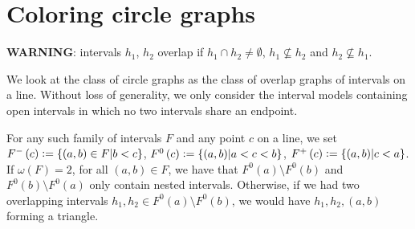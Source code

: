 \documentclass[12pt]{article}
\theoremstyle{definition}
\newcommand{\defeq}{\vcentcolon=}
\begin{document}
    \section{Coloring circle graphs}
    
    \textbf{WARNING}: intervals
    $h_1$, $h_2$ overlap if
    $h_1 \cap h_2 \neq \emptyset$,
    $h_1 \not \subseteq h_2$ and
    $h_2 \not \subseteq h_1$.
    \vspace{4pt}

    We look at the class
    of circle graphs as the class
    of overlap graphs of intervals on a line.
    Without loss of generality,
    we only consider the interval
    models containing open intervals
    in which no two intervals
    share an endpoint.

    For any such family of intervals
    $F$ and any point $c$ on a line,
    we set $F^{-}\left(c\right) \defeq
    \left\{\left(a, b\right) \in F
    \middle| b < c\right\}$,
    $F^{0}\left(c\right) \defeq
    \left\{\left(a, b\right)
    \middle| a < c < b\right\}$,
    $F^{+}\left(c\right) \defeq
    \left\{\left(a, b\right)
    \middle| c < a\right\}$.
    If $\omega\left(F\right) = 2$,
    for all $\left(a, b\right) \in F$,
    we have that
    $F^{0}\left(a\right) \setminus F^{0}\left(b\right)$ 
    and $F^{0}\left(b\right) \setminus F^{0}\left(a\right)$
    only contain nested intervals.
    Otherwise, if we had two
    overlapping intervals $h_1, h_2 \in
    F^{0}\left(a\right) \setminus F^{0}\left(b\right)$,
    we would have $h_1, h_2, \left(a, b\right)$ 
    forming a triangle.
\end{document}
